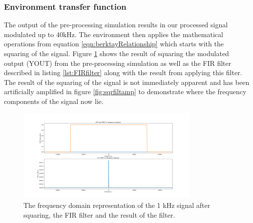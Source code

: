 \subsubsection{Environment transfer function}
The output of the pre-processing simulation results in our processed signal modulated up to 40kHz. The environment then applies the mathematical operations from equation \ref{eqn:berktayRelationship} which starts with the squaring of the signal. Figure \ref{fig:sqrfilt} shows the result of squaring the modulated output (YOUT)  from the pre-processing simulation as well as the FIR filter described in listing \ref{lst:FIRfilter} along with the result from applying this filter. The result of the squaring of the signal is not immediately apparent and has been artificially amplified in figure \ref{fig:sqrfiltamp} to demonstrate where the frequency components of the signal now lie.
\begin{figure}[ht!]
    \centering
    \includegraphics[width=0.8\textwidth]{Figures/SigSimulation/yRxsqr_LPFfft.png}
    \caption{The frequency domain representation of the 1 kHz signal after squaring, the FIR filter and the result of the filter.}
    \label{fig:sqrfilt}
\end{figure}

